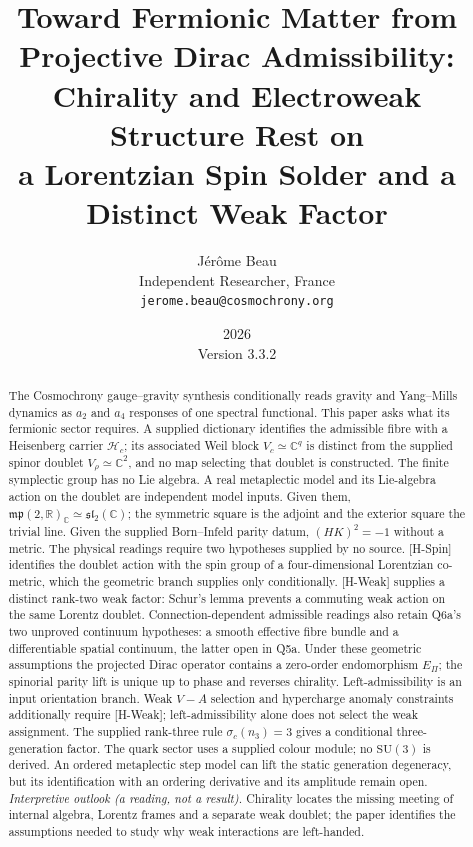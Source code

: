\documentclass[11pt,a4paper]{article}
\title{Toward Fermionic Matter from Projective Dirac Admissibility:\\
Chirality and Electroweak Structure Rest on\\
a Lorentzian Spin Solder and a Distinct Weak Factor}
\author{J\'er\^ome Beau\\[4pt]
\small Independent Researcher, France\\
\small \texttt{jerome.beau@cosmochrony.org}}
\date{2026\\[2pt]\small Version 3.3.2}
\theoremstyle{definition}
\theoremstyle{remark}
\begin{document}
  \maketitle

  \begin{abstract}
    The Cosmochrony gauge--gravity synthesis conditionally reads gravity and Yang--Mills dynamics as
    $a_2$ and $a_4$ responses of one spectral functional.
    This paper asks what its fermionic sector requires.
    A supplied dictionary identifies the admissible fibre with a Heisenberg carrier $\mathcal{H}_c$;
    its associated Weil block $V_c \simeq \mathbb{C}^q$ is distinct from the supplied spinor doublet
    $V_\rho \simeq \mathbb{C}^2$, and no map selecting that doublet is constructed.
    The finite symplectic group has no Lie algebra.
    A real metaplectic model and its Lie-algebra action on the doublet are independent model inputs.
    Given them, $\mathfrak{mp}(2,\mathbb{R})_\mathbb{C} \simeq \mathfrak{sl}_2(\mathbb{C})$;
    the symmetric square is the adjoint and the exterior square the trivial line.
    Given the supplied Born--Infeld parity datum, $(HK)^2=-1$ without a metric.
    The physical readings require two hypotheses supplied by no source.
    [H-Spin] identifies the doublet action with the spin group of a four-dimensional Lorentzian co-metric,
    which the geometric branch supplies only conditionally.
    [H-Weak] supplies a distinct rank-two weak factor: Schur's lemma prevents a commuting weak action
    on the same Lorentz doublet.
    Connection-dependent admissible readings also retain Q6a's two unproved continuum hypotheses:
    a smooth effective fibre bundle and a differentiable spatial continuum, the latter open in Q5a.
    Under these geometric assumptions the projected Dirac operator contains a zero-order endomorphism $E_\Pi$;
    the spinorial parity lift is unique up to phase and reverses chirality.
    Left-admissibility is an input orientation branch.
    Weak $V{-}A$ selection and hypercharge anomaly constraints additionally require [H-Weak];
    left-admissibility alone does not select the weak assignment.
    The supplied rank-three rule $\sigma_c(n_3)=3$ gives a conditional three-generation factor.
    The quark sector uses a supplied colour module; no $\mathrm{SU}(3)$ is derived.
    An ordered metaplectic step model can lift the static generation degeneracy, but its identification
    with an ordering derivative and its amplitude remain open.
    \emph{Interpretive outlook (a reading, not a result).}
    Chirality locates the missing meeting of internal algebra, Lorentz frames and a separate weak doublet;
    the paper identifies the assumptions needed to study why weak interactions are left-handed.
  \end{abstract}
\end{document}
